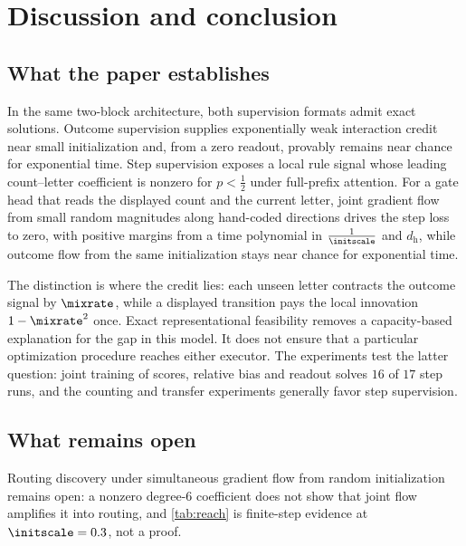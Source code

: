 \section{Discussion and conclusion}
\label{sec:conclusion}
\label{sec:discussion}

\subsection{What the paper establishes}
In the same two-block architecture, both supervision formats admit exact solutions.
Outcome supervision supplies exponentially weak interaction credit near small initialization and, from a zero readout,
provably remains near chance for exponential time. Step supervision exposes a local rule signal whose leading count--letter
coefficient is nonzero for $p<\tfrac{1}{2}$ under full-prefix attention. For a gate head that reads the displayed count and the
current letter, joint gradient flow from small random magnitudes along hand-coded directions drives the step loss to zero,
with positive margins from a time polynomial in $\frac{1}{\initscale}$ and $d_{\mathrm h}$, while outcome flow from the same
initialization stays near chance for exponential time.

The distinction is where the credit lies: each unseen letter contracts the outcome signal by $\mixrate$, while a displayed
transition pays the local innovation $1-\mixrate^2$ once. Exact representational feasibility removes a capacity-based explanation
for the gap in this model. It does not ensure that a particular optimization procedure reaches either executor.
The experiments test the latter question: joint training of scores, relative bias and readout solves $16$ of $17$ step runs,
and the counting and transfer experiments generally favor step supervision.

\subsection{What remains open}
Routing discovery under simultaneous gradient flow from random initialization remains open: a nonzero degree-$6$
coefficient does not show that joint flow amplifies it into routing, and \cref{tab:reach} is finite-step evidence at $\initscale=0.3$, not a proof.

